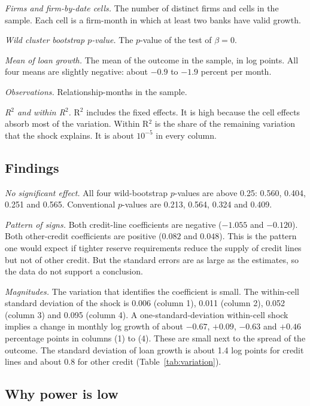 \documentclass[11pt]{article}
\renewcommand{\_}{\origunderscore\hspace{0pt}}  %
\begin{document}
\textit{Firms and firm-by-date cells.}
The number of distinct firms and cells in the sample.
Each cell is a firm-month in which at least two banks have valid growth.

\textit{Wild cluster bootstrap $p$-value.}
The $p$-value of the test of $\beta=0$.

\textit{Mean of loan growth.}
The mean of the outcome in the sample, in log points.
All four means are slightly negative: about $-0.9$ to $-1.9$ percent per month.

\textit{Observations.}
Relationship-months in the sample.

\textit{R$^2$ and within R$^2$.}
R$^2$ includes the fixed effects.
It is high because the cell effects absorb most of the variation.
Within R$^2$ is the share of the remaining variation that the shock explains.
It is about $10^{-5}$ in every column.

\subsection{Findings}

\textit{No significant effect.}
All four wild-bootstrap $p$-values are above 0.25: 0.560, 0.404, 0.251 and 0.565.
Conventional $p$-values are 0.213, 0.564, 0.324 and 0.409.

\textit{Pattern of signs.}
Both credit-line coefficients are negative ($-1.055$ and $-0.120$).
Both other-credit coefficients are positive ($0.082$ and $0.048$).
This is the pattern one would expect if tighter reserve requirements reduce the supply of credit lines but not of other credit.
But the standard errors are as large as the estimates, so the data do not support a conclusion.

\textit{Magnitudes.}
The variation that identifies the coefficient is small.
The within-cell standard deviation of the shock is 0.006 (column 1), 0.011 (column 2), 0.052 (column 3) and 0.095 (column 4).
A one-standard-deviation within-cell shock implies a change in monthly log growth of about $-0.67$, $+0.09$, $-0.63$ and $+0.46$ percentage points in columns (1) to (4).
These are small next to the spread of the outcome.
The standard deviation of loan growth is about 1.4 log points for credit lines and about 0.8 for other credit (Table~\ref{tab:variation}).

\subsection{Why power is low}
\end{document}

